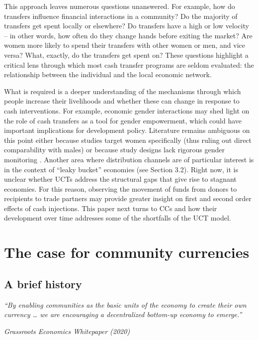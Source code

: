 \documentclass[12pt]{article}
\begin{document}
This approach leaves numerous questions unanswered. For example, how do transfers influence financial interactions in a community? Do the majority of transfers get spent locally or elsewhere? Do transfers have a high or low velocity – in other words, how often do they change hands before exiting the market? Are women more likely to spend their transfers with other women or men, and vice versa? What, exactly, do the transfers get spent on? These questions highlight a critical lens through which most cash transfer programs are seldom evaluated: the relationship between the individual and the local economic network.

What is required is a deeper understanding of the mechanisms through which people increase their livelihoods and whether these can change in response to cash interventions. For example, economic gender interactions may shed light on the role of cash transfers as a tool for gender empowerment, which could have important implications for development policy. Literature remains ambiguous on this point either because studies target women specifically (thus ruling out direct comparability with males) or because study designs lack rigorous gender monitoring \citep{browne2014evidence}. Another area where distribution channels are of particular interest is in the context of “leaky bucket” economies (see Section 3.2). Right now, it is unclear whether UCTs address the structural gaps that give rise to stagnant economies. For this reason, observing the movement of funds from donors to recipients to trade partners may provide greater insight on first and second order effects of cash injections. This paper next turns to CCs and how their development over time addresses some of the shortfalls of the UCT model.


\section{The case for community currencies} 
\label{sec:section3}
\subsection{A brief history}
\textit{“By enabling communities as the basic units of the economy to create their own currency … we are encouraging a decentralized bottom-up economy to emerge.”}

\hspace*{\fill}\textit{Grassroots Economics Whitepaper (2020)}
\end{document}
